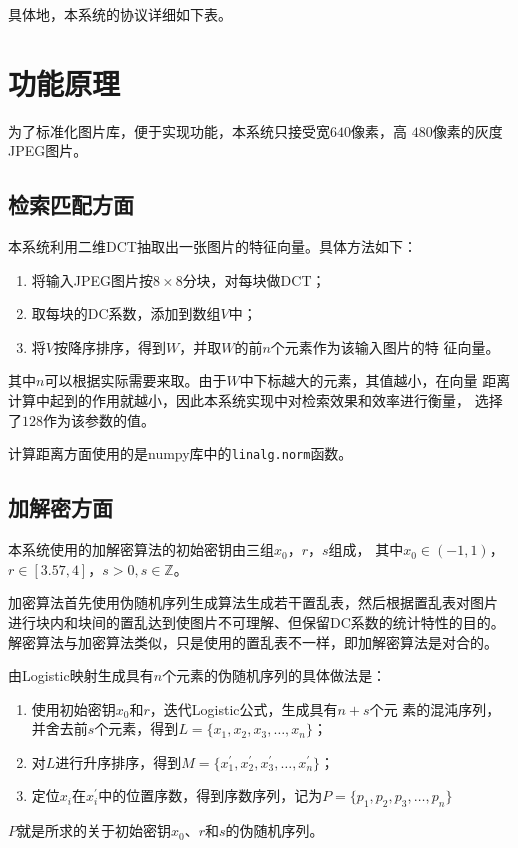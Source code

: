 具体地，本系统的协议详细如下表。


\section{功能原理}
\label{sec:func-impl}

为了标准化图片库，便于实现功能，本系统只接受宽$640$像素，高
$480$像素的灰度JPEG图片。

\subsection{检索匹配方面}
\label{sec:retrieval-impl}
本系统利用二维DCT抽取出一张图片的特征向量。具体方法如下：
\begin{enumerate}
\item 将输入JPEG图片按$8 \times 8$分块，对每块做DCT；
\item 取每块的DC系数，添加到数组$V$中；
\item 将$V$按降序排序，得到$W$，并取$W$的前$n$个元素作为该输入图片的特
  征向量。
\end{enumerate}

其中$n$可以根据实际需要来取。由于$W$中下标越大的元素，其值越小，在向量
距离计算中起到的作用就越小，因此本系统实现中对检索效果和效率进行衡量，
选择了$128$作为该参数的值。

计算距离方面使用的是numpy库中的\texttt{linalg.norm}函数。

\subsection{加解密方面}
\label{sec:enc-dec-impl}
本系统使用的加解密算法的初始密钥由三组$x_0$，$r$，$s$组成，
其中$x_0 \in (-1, 1)$，$r \in [3.57, 4]$，$s > 0, s \in \mathbb{Z}$。


加密算法首先使用伪随机序列生成算法生成若干置乱表，然后根据置乱表对图片
进行块内和块间的置乱达到使图片不可理解、但保留DC系数的统计特性的目的。
解密算法与加密算法类似，只是使用的置乱表不一样，即加解密算法是对合的。

由Logistic映射生成具有$n$个元素的伪随机序列的具体做法\cite{lu2007}是：
\begin{enumerate}
  \item 使用初始密钥$x_0$和$r$，迭代Logistic公式，生成具有$n + s$个元
      素的混沌序列，并舍去前$s$个元素，得到$L = \{x_1, x_2, x_3, \dotsc, x_n\}$；
  \item 对$L$进行升序排序，得到$M = \{x_1^\prime, x_2^\prime, x_3^\prime,
      \dotsc, x_n^\prime\}$；
  \item 定位$x_i$在$x_i^\prime$中的位置序数，得到序数序列，记为$P =
      \{p_1, p_2, p_3, \dotsc, p_n\}$
\end{enumerate}
$P$就是所求的关于初始密钥$x_0$、$r$和$s$的伪随机序列。

